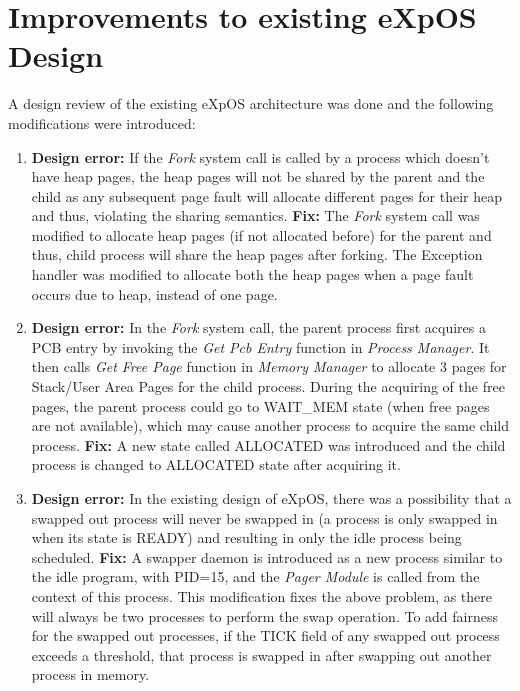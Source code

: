 \documentclass[12pt]{report}
\begin{document}
\section{Improvements to existing eXpOS Design}
A design review of the existing eXpOS architecture was done and the following modifications were introduced:
\begin{enumerate}
    \item 
    \textbf{Design error:} If the \emph{Fork} system call is called by a process which doesn't have heap pages, the heap pages will not be shared by the parent and the child as any subsequent page fault will allocate different pages for their heap and thus, violating the sharing semantics. 
    \newline
    \textbf{Fix:} The \emph{Fork} system call was modified to allocate heap pages (if not allocated before) for the parent and thus, child process will share the heap pages after forking. The Exception handler was modified to allocate both the heap pages when a page fault occurs due to heap, instead of one page.
    
    \item
    \textbf{Design error:} In the \emph{Fork} system call, the parent process first acquires a PCB entry by invoking the \emph{Get Pcb Entry} function in \emph{Process Manager}. It then calls \emph{Get Free Page} function in \emph{Memory Manager} to allocate 3 pages for Stack/User Area Pages for the child process. During the acquiring of the free pages, the parent process could go to WAIT\_MEM state (when free pages are not available), which may cause another process to acquire the same child process.
    \newline
    \textbf{Fix:} A new state called ALLOCATED was introduced and the child process is changed to ALLOCATED state after acquiring it.
    
    \item
    \textbf{Design error:} In the existing design of eXpOS, there was a possibility that a swapped out process will never be swapped in (a process is only swapped in when its state is READY) and resulting in only the idle process being scheduled.
    \newline
    \textbf{Fix:} A swapper daemon is introduced as a new process similar to the idle program, with PID=15, and the \emph{Pager Module} is called from the context of this process. This modification fixes the above problem, as there will always be two processes to perform the swap operation. To add fairness for the swapped out processes, if the TICK field of any swapped out process exceeds a threshold, that process is swapped in after swapping out another process in memory.
    

\end{enumerate}
\end{document}
